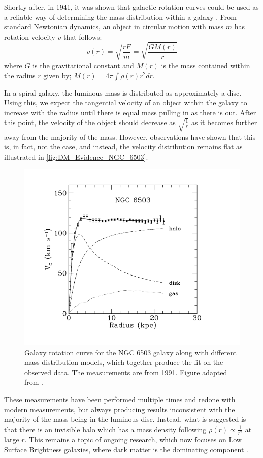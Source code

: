 \par
Shortly after, in 1941, it was shown that galactic rotation curves could be used as a reliable way of determining the mass distribution within a galaxy \cite{Chandrasekhar_1941_ref}.
From standard Newtonian dynamics, an object in circular motion with mass $m$ has rotation velocity $v$ that follows:
\begin{equation}
    v(r) = \sqrt{\frac{rF}{m}} = \sqrt{\frac{GM(r)}{r}}
    \label{eq:Kepler_Motion}
\end{equation}
where $G$ is the gravitational constant and $M(r)$ is the mass contained within the radius $r$ given by; $M(r) = 4 \pi \int \rho(r) r^{2} dr$.
\par
In a spiral galaxy, the luminous mass is distributed as approximately a disc. 
Using this, we expect the tangential velocity of an object within the galaxy to increase with the radius until there is equal mass pulling in as there is out.
After this point, the velocity of the object should decrease as $\sqrt{\frac{1}{r}}$ as it becomes further away from the majority of the mass.
However, observations have shown that this is, in fact, not the case, and instead, the velocity distribution remains flat as illustrated in \autoref{fig:DM_Evidence_NGC_6503}.
\begin{figure}[]%
    \centering
    \includegraphics[scale=1.0]{Figures/DarkMatterEvidence/NGC_6503_galaxy_speed.png}
    \caption[Galaxy rotation curve for the NGC 6503 galaxy]{Galaxy rotation curve for the NGC 6503 galaxy along with different mass distribution models, which together produce the fit on the observed data. The measurements are from 1991. Figure adapted from \cite{NGC_6503_galaxy_rotation_ref}.}
    \label{fig:DM_Evidence_NGC_6503}
\end{figure}
These measurements have been performed multiple times and redone with modern measurements, but always producing results inconsistent with the majority of the mass being in the luminous disc.
Instead, what is suggested is that there is an invisible halo which has a mass density following $\rho(r) \propto \frac{1}{r^2}$ at large $r$.
This remains a topic of ongoing research, which now focuses on Low Surface Brightness galaxies, where dark matter is the dominating component \cite{MHONGOOSE_2018_ref}.


